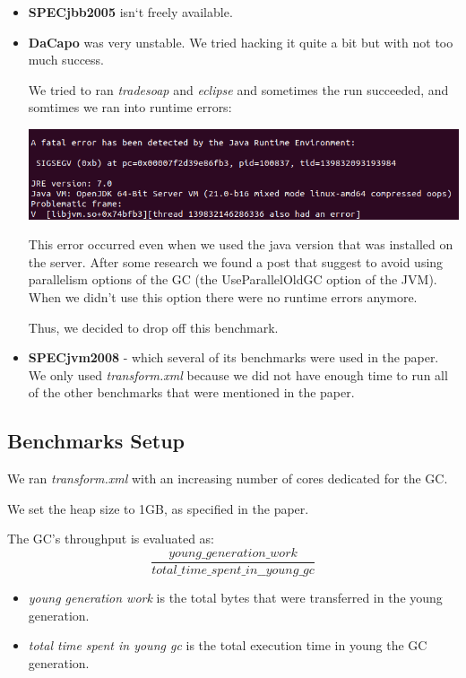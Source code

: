 \documentclass{article}
\begin{document}
 \begin{itemize}
   \item \textbf{SPECjbb2005} isn`t freely available.
   \item \textbf{DaCapo} was very unstable. We tried hacking it quite a bit but with not too much success.

	   We tried to ran \textit{tradesoap} and \textit{eclipse} and sometimes the run succeeded, and somtimes we ran into runtime errors:

 \includegraphics[width=\textwidth]{dacapo_error.png}

         This error occurred even when we used the java version that was installed on the server.
         After some research we found a post that suggest to avoid using parallelism options of the GC (the UseParallelOldGC option of the JVM). When we didn't use this option there were no runtime errors anymore.

         Thus, we decided to drop off this benchmark.
   \item \textbf{SPECjvm2008} - which several of its benchmarks were used in the paper. We only used \textit{transform.xml} because we did not have enough time to run all of the other benchmarks that were mentioned in the paper.
 \end{itemize}

 \subsection{Benchmarks Setup}
 We ran \textit{transform.xml} with an increasing number of cores dedicated for the GC.

 We set the heap size to 1GB, as specified in the paper.

 The GC's throughput is evaluated as:
 \begin{equation}
	 \frac{young\_generation\_work}{total\_time\_spent\_in\_\_young\_gc}
 \end{equation}

 \begin{itemize}
   \item \textit{young generation work} is the total bytes that were transferred in the young generation.
   \item \textit{total time spent in young gc} is the total execution time in young the GC generation.
 \end{itemize}
\end{document}
